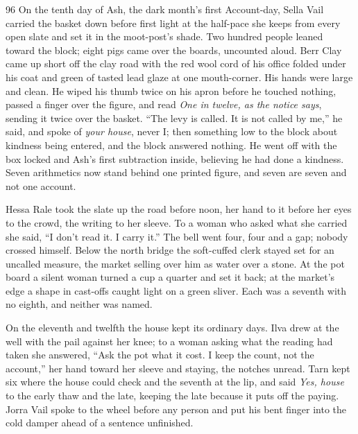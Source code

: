 
\scenebreak


\scenebreak


\scenebreak

\CRtailpiece
\begin{CRchronicle}{96}
On the tenth day of Ash, the dark month’s first Account-day, Sella Vail carried the basket down before first light at the half-pace she keeps from every open slate and set it in the moot-post’s shade. Two hundred people leaned toward the block; eight pigs came over the boards, uncounted aloud. Berr Clay came up short off the clay road with the red wool cord of his office folded under his coat and green of tasted lead glaze at one mouth-corner. His hands were large and clean. He wiped his thumb twice on his apron before he touched nothing, passed a finger over the figure, and read \emph{One in twelve, as the notice says}, sending it twice over the basket. “The levy is called. It is not called by me,” he said, and spoke of \emph{your house}, never I; then something low to the block about kindness being entered, and the block answered nothing. He went off with the box locked and Ash’s first subtraction inside, believing he had done a kindness. Seven arithmetics now stand behind one printed figure, and seven are seven and not one account.

Hessa Rale took the slate up the road before noon, her hand to it before her eyes to the crowd, the writing to her sleeve. To a woman who asked what she carried she said, “I don’t read it. I carry it.” The bell went four, four and a gap; nobody crossed himself. Below the north bridge the soft-cuffed clerk stayed set for an uncalled measure, the market selling over him as water over a stone. At the pot board a silent woman turned a cup a quarter and set it back; at the market’s edge a shape in cast-offs caught light on a green sliver. Each was a seventh with no eighth, and neither was named.

On the eleventh and twelfth the house kept its ordinary days. Ilva drew at the well with the pail against her knee; to a woman asking what the reading had taken she answered, “Ask the pot what it cost. I keep the count, not the account,” her hand toward her sleeve and staying, the notches unread. Tarn kept six where the house could check and the seventh at the lip, and said \emph{Yes, house} to the early thaw and the late, keeping the late because it puts off the paying. Jorra Vail spoke to the wheel before any person and put his bent finger into the cold damper ahead of a sentence unfinished.


\end{CRchronicle}
